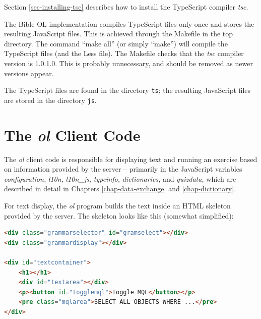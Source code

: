 \documentclass[11pt,oneside,a4paper]{memoir}
\begin{document}
Section \ref{sec-installing-tsc} describes how to install the TypeScript compiler \emph{tsc}.

The Bible OL implementation compiles TypeScript files only once and stores the resulting JavaScript
files. This is achieved through the Makefile in the top directory. The command ``make all'' (or
simply ``make'') will compile the TypeScript files (and the Less file). The Makefile checks that the
\emph{tsc} compiler version is 1.0.1.0. This is probably unnecessary, and should be removed as newer
versions appear.

The TypeScript files are found in the directory \texttt{ts}; the resulting JavaScript files are
stored in the directory \texttt{js}.

\section{The \emph{ol} Client Code}\label{sec-ol}

The \emph{ol} client code is responsible for displaying text and running an exercise based on
information provided by the server -- primarily in the JavaScript variables \emph{configuration,}%
\emph{l10n,}%
\emph{l10n\_js,}%
\emph{typeinfo,}%
\emph{dictionaries,}%
and \emph{quizdata,}%
which are described in detail in Chapters \ref{chap-data-exchange} and \ref{chap-dictionary}.

For text display, the \emph{ol} program builds the text inside an HTML skeleton provided by the
server. The skeleton looks like this (somewhat simplified):


\begin{lstlisting}[language=HTML]
<div class="grammarselector" id="gramselect"></div>
<div class="grammardisplay"></div>

<div id="textcontainer">
    <h1></h1>
    <div id="textarea"></div>
    <p><button id="togglemql">Toggle MQL</button></p>
    <pre class="mqlarea">SELECT ALL OBJECTS WHERE ...</pre>
</div>
\end{lstlisting}
\end{document}
